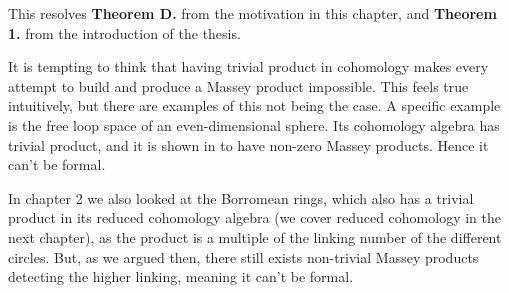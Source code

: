 This resolves \textbf{Theorem D.} from the motivation in this chapter, and \textbf{Theorem 1.} from the introduction of the thesis. 

It is tempting to think that having trivial product in cohomology makes every attempt to build and produce a Massey product impossible. This feels true intuitively, but there are examples of this not being the case. A specific example is the free loop space of an even-dimensional sphere. Its cohomology algebra has trivial product, and it is shown in \cite[Theorem 3.5]{nonformal_loop} to have non-zero Massey products. Hence it can't be formal. 

In chapter 2 we also looked at the Borromean rings, which also has a trivial product in its reduced cohomology algebra (we cover reduced cohomology in the next chapter), as the product is a multiple of the linking number of the different circles. But, as we argued then, there still exists non-trivial Massey products detecting the higher linking, meaning it can't be formal. 



